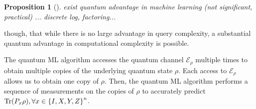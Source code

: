 \documentclass[
aps,
pra,
floatfix,
]{revtex4-2}
\theoremstyle{plain}
\newtheorem{theorem}{Theorem}
\newtheorem{proposition}{Proposition}
\theoremstyle{definition}
\newcommand{\dm}{\rho}
\begin{document}
\begin{proposition}[\cite{huangPowerDataQuantum2021}]
	exist quantum advantage in machine learning (not significant, practical)	...
	discrete log, factoring...
\end{proposition}

though, that while there is no large advantage in query complexity, a substantial quantum advantage in computational complexity is possible.

The quantum ML algorithm accesses the quantum channel $\mathcal{E}_\dm$ multiple times to obtain multiple copies of the underlying quantum state $\dm$. Each access to $\mathcal{E}_\dm$ allows us to obtain one copy of $\dm$. Then, the quantum ML algorithm performs a sequence of measurements on the copies of $\dm$ to accurately predict $\Tr(P_x \dm ), \forall x \in \qty{ I, X, Y, Z }^n$.
\end{document}
